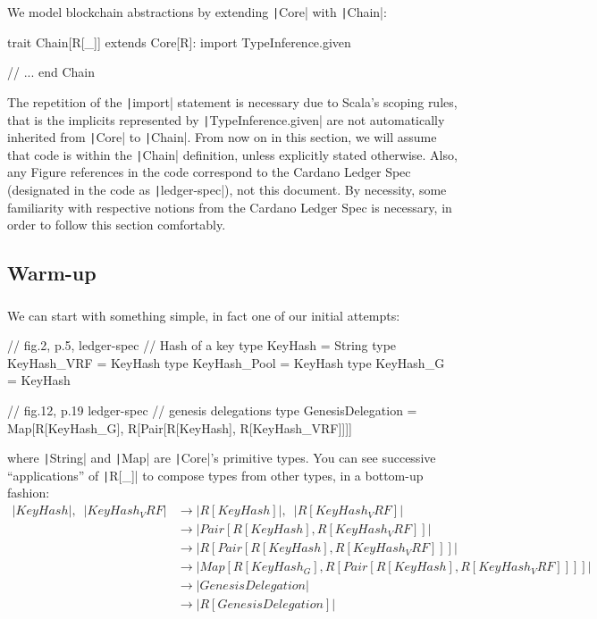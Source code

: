 \documentclass[11pt]{article}
\newcommand{\ScalaI}[1]{\texttt|#1|}
\newcommand{\TextI}[1]{\texttt|#1|}
\begin{document}
We model blockchain abstractions by extending \ScalaI{Core} with \ScalaI{Chain}:

\begin{ScalaBlockSimple}
trait Chain[R[_]] extends Core[R]:
  import TypeInference.given
  
  // ...
end Chain
\end{ScalaBlockSimple}

\noindent The repetition of the \ScalaI{import} statement is necessary due to 
Scala's scoping rules, that is the implicits represented by 
\ScalaI{TypeInference.given} are not automatically inherited from 
\ScalaI{Core} to \ScalaI{Chain}. From now on in this section, we will assume 
that code is within the \ScalaI{Chain} definition, unless explicitly stated 
otherwise. Also, any Figure references in the code correspond to the Cardano 
Ledger Spec (designated in the code as \TextI{ledger-spec}), not this 
document. By necessity, some familiarity with respective notions from the 
Cardano Ledger Spec is necessary, in order to follow this section comfortably.

\subsection{Warm-up}
\label{sec:chain:warmup}

\subsubsection*{\fbox{\ScalaI{GenesisDelegation}}}

We can start with something simple, in fact one of our initial attempts:

\begin{ScalaBlockSimple}
  // fig.2, p.5, ledger-spec
  // Hash of a key
  type KeyHash = String
  type KeyHash_VRF  = KeyHash
  type KeyHash_Pool = KeyHash
  type KeyHash_G    = KeyHash
  
  // fig.12, p.19 ledger-spec
  // genesis delegations
  type GenesisDelegation =
    Map[R[KeyHash_G], R[Pair[R[KeyHash], R[KeyHash_VRF]]]]
\end{ScalaBlockSimple}

\noindent where \ScalaI{String} and \ScalaI{Map} are \ScalaI{Core}'s 
primitive types. You can see successive ``applications'' of \ScalaI{R[_]} to 
compose types from other types, in a bottom-up fashion:
\begin{align*}
\ScalaI{KeyHash}, \enspace \ScalaI{KeyHash_VRF} 
  & \to \ScalaI{R[KeyHash]}, \enspace \ScalaI{R[KeyHash_VRF]} \\
  & \to \ScalaI{Pair[R[KeyHash], R[KeyHash_VRF]]} \\ 
  & \to \ScalaI{R[Pair[R[KeyHash], R[KeyHash_VRF]]]} \\ 
  & \to \ScalaI{Map[R[KeyHash_G], R[Pair[R[KeyHash], R[KeyHash_VRF]]]]} \\
  & \to \ScalaI{GenesisDelegation} \\
  & \to \ScalaI{R[GenesisDelegation]}
\end{align*}
\end{document}
